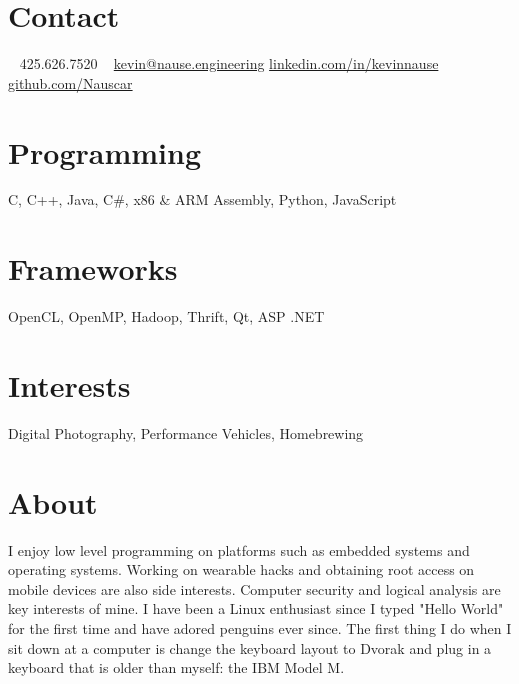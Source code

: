 \documentclass[print]{friggeri-cv} %
\begin{document}


\begin{aside} %
\section{Contact}
~
425.626.7520
~
{\scriptsize \href{mailto:kevin@nause.engineering}{kevin@nause.engineering}}
{\scriptsize \href{https://linkedin.com/in/kevinnause}{linkedin.com/in/kevinnause}}
{\scriptsize \href{https://github.com/Nauscar}{github.com/Nauscar}}
\section{Programming}
C, C++, Java, C\#, 
x86 \& ARM Assembly, 
Python, JavaScript
\section{Frameworks}
OpenCL, OpenMP,
Hadoop, Thrift, 
Qt, ASP .NET
\section{Interests}
{Digital Photography, Performance Vehicles, Homebrewing}
\section{About}
{I enjoy low level programming on platforms such as embedded systems and operating systems.
Working on wearable hacks and obtaining root access on mobile devices are also side interests. 
Computer security and logical analysis are key interests of mine. 
I have been a Linux enthusiast since I typed "Hello World" for the first time and have adored penguins ever since. 
The first thing I do when I sit down at a computer is change the keyboard layout to Dvorak and plug in a keyboard that is older than myself: the IBM Model M.}
\end{aside}

\end{document}
